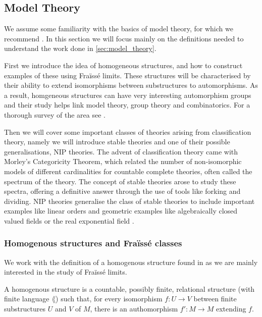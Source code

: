 \newpage

\subsection{Model Theory}%
\label{sub:model_theory}

We assume some familiarity with the basics of model theory, for which we recommend \cite{marker02}.
In this section we will focus mainly on the definitions needed to understand the work done in
\cref{sec:model_theory}.

First we introduce the idea of homogeneous structures, and how to construct examples of these
using Fraïssé limits. These structures will be characterised by their ability to extend isomorphisms
between substructures to automorphisms. As a result, homgeneous structures can have very interesting
automorphism groups and their study helps link model theory, group theory and combinatorics. For a
thorough survey of the area see \cite{macpherson11}.

Then we will cover some important classes of theories arising from classification theory, namely we
will introduce stable theories and one of their possible generalisations, NIP theories. The advent
of classification theory came with Morley's Categoricity Theorem, which related the number of
non-isomorphic models of different cardinalities for countable complete theories, often called the
spectrum of the theory. The concept of stable theories arose to study these spectra, offering a
definitive answer through the use of tools like forking and dividing. NIP theories generalise the
class of stable theories to include important examples like linear orders and geometric examples
like algebraically closed valued fields \cite{acvf-NIP} or the real exponential field
\cite{steinhorn1999}.

\subsubsection{Homogenous structures and Fraïssé classes}%
\label{ssub:homogeneous_structures_and_fraisse_classes}

We work with the definition of a homogenous structure found in \cite{macpherson11} as we are
mainly interested in the study of Fraïssé limits.

\begin{defn}
  A homogenous structure is a countable, possibly finite, relational structure (with finite
  language $\lang$) such that, for every isomorphism $f : U \to V$ between finite substructures $U$
  and $V$ of $M$, there is an authomorphism $f' : M \to M$ extending $f$.
\end{defn}

